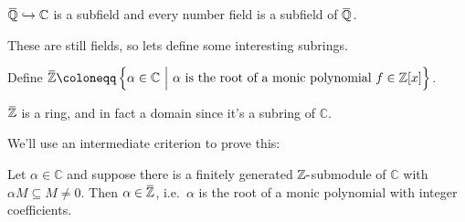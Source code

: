 \begin{corollary}[?]

\(\mkern 1.5mu\overline{\mkern-1.5mu{\mathbb{Q}}\mkern-1.5mu}\mkern 1.5mu\hookrightarrow{\mathbb{C}}\)
is a subfield and every number field is a subfield of
\(\mkern 1.5mu\overline{\mkern-1.5mu{\mathbb{Q}}\mkern-1.5mu}\mkern 1.5mu\).

\end{corollary}

These are still fields, so lets define some interesting subrings.

\begin{definition}[$\bar \ZZ$ ]

Define
\(\mkern 1.5mu\overline{\mkern-1.5mu{\mathbb{Z}}\mkern-1.5mu}\mkern 1.5mu\coloneqq\left\{{ \alpha\in {\mathbb{C}}{~\mathrel{\Big|}~}\alpha\text{ is the root of a monic polynomial }f\in {\mathbb{Z}}[x]}\right\}\).

\end{definition}

\begin{theorem}

\(\mkern 1.5mu\overline{\mkern-1.5mu{\mathbb{Z}}\mkern-1.5mu}\mkern 1.5mu\)
is a ring, and in fact a domain since it's a subring of
\({\mathbb{C}}\).

\end{theorem}

We'll use an intermediate criterion to prove this:

\begin{proposition}

Let \(\alpha\in {\mathbb{C}}\) and suppose there is a finitely generated
\({\mathbb{Z}}{\hbox{-}}\)submodule of \({\mathbb{C}}\) with
\(\alpha M \subseteq M \neq 0\). Then
\(\alpha\in \mkern 1.5mu\overline{\mkern-1.5mu{\mathbb{Z}}\mkern-1.5mu}\mkern 1.5mu\),
i.e.~\(\alpha\) is the root of a monic polynomial with integer
coefficients.

\end{proposition}

